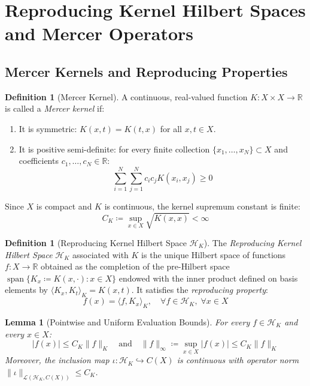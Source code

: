 \documentclass[11pt,a4paper]{article}
\newtheorem{lemma}[theorem]{Lemma}
\theoremstyle{definition}
\newtheorem{definition}[theorem]{Definition}
\begin{document}
\section{Reproducing Kernel Hilbert Spaces and Mercer Operators}\label{sec:rkhs}

\subsection{Mercer Kernels and Reproducing Properties}

\begin{definition}[Mercer Kernel]\label{def:mercer_kernel}
A continuous, real-valued function $K: X \times X \to \mathbb{R}$ is called a \emph{Mercer kernel} if:
\begin{enumerate}
    \item It is symmetric: $K(x, t) = K(t, x)$ for all $x, t \in X$.
    \item It is positive semi-definite: for every finite collection $\{x_1, \dots, x_N\} \subset X$ and coefficients $c_1, \dots, c_N \in \mathbb{R}$:
    \begin{equation}\label{eq:psd_kernel}
    \sum_{i=1}^N \sum_{j=1}^N c_i c_j K(x_i, x_j) \ge 0
    \end{equation}
\end{enumerate}
Since $X$ is compact and $K$ is continuous, the kernel supremum constant is finite:
\begin{equation}\label{eq:CK_def}
C_K \coloneqq \sup_{x \in X} \sqrt{K(x, x)} < \infty
\end{equation}
\end{definition}

\begin{definition}[Reproducing Kernel Hilbert Space $\mathcal{H}_K$]\label{def:rkhs}
The \emph{Reproducing Kernel Hilbert Space} $\mathcal{H}_K$ associated with $K$ is the unique Hilbert space of functions $f: X \to \mathbb{R}$ obtained as the completion of the pre-Hilbert space $\operatorname{span}\{ K_x \coloneqq K(x, \cdot) : x \in X \}$ endowed with the inner product defined on basis elements by $\langle K_x, K_t \rangle_K = K(x, t)$.
It satisfies the \emph{reproducing property}:
\begin{equation}\label{eq:reproducing_property}
f(x) = \langle f, K_x \rangle_K, \quad \forall f \in \mathcal{H}_K, \; \forall x \in X
\end{equation}
\end{definition}

\begin{lemma}[Pointwise and Uniform Evaluation Bounds]\label{lem:pointwise_bound}
For every $f \in \mathcal{H}_K$ and every $x \in X$:
\begin{equation}\label{eq:rkhs_bound}
|f(x)| \le C_K \|f\|_K \quad \text{and} \quad \|f\|_\infty \coloneqq \sup_{x \in X} |f(x)| \le C_K \|f\|_K
\end{equation}
Moreover, the inclusion map $\iota: \mathcal{H}_K \hookrightarrow C(X)$ is continuous with operator norm $\|\iota\|_{\mathcal{L}(\mathcal{H}_K, C(X))} \le C_K$.
\end{lemma}
\end{document}
